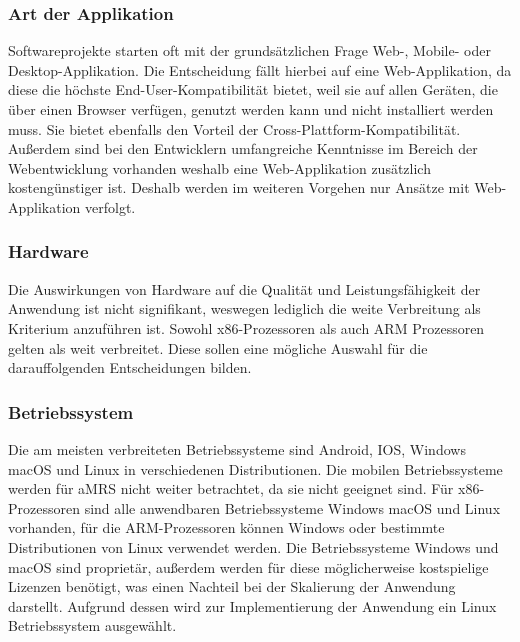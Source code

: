 \subsubsection*{Art der Applikation}
Softwareprojekte starten oft mit der grundsätzlichen Frage Web-, Mobile- oder Desktop-Applikation. Die Entscheidung fällt hierbei auf eine Web-Applikation, da diese die höchste End-User-Kompatibilität bietet, weil sie auf allen Geräten, die über einen Browser verfügen, genutzt werden kann und nicht installiert werden muss.
Sie bietet ebenfalls den Vorteil der Cross-Plattform-Kompatibilität.
Außerdem sind bei den Entwicklern umfangreiche Kenntnisse im Bereich der Webentwicklung vorhanden weshalb eine Web-Applikation zusätzlich kostengünstiger ist. 
Deshalb werden im weiteren Vorgehen nur Ansätze mit Web-Applikation verfolgt.
\subsubsection*{Hardware}
Die Auswirkungen von Hardware auf die Qualität und Leistungsfähigkeit der Anwendung ist nicht signifikant, weswegen lediglich die weite Verbreitung als Kriterium anzuführen ist.
Sowohl x86-Prozessoren als auch ARM Prozessoren gelten als weit verbreitet.
Diese sollen eine mögliche Auswahl für die darauffolgenden Entscheidungen bilden.
\subsubsection*{Betriebssystem}
Die am meisten verbreiteten Betriebssysteme sind Android, IOS, Windows macOS und Linux in verschiedenen Distributionen.
Die mobilen Betriebssysteme werden für \ac{aMRS} nicht weiter betrachtet, da sie nicht geeignet sind.
Für x86-Prozessoren sind alle anwendbaren Betriebssysteme Windows macOS und Linux vorhanden, für die ARM-Prozessoren können Windows oder bestimmte Distributionen von Linux verwendet werden.
Die Betriebssysteme Windows und macOS sind proprietär, außerdem werden für diese möglicherweise kostspielige Lizenzen benötigt, was einen Nachteil bei der Skalierung der Anwendung darstellt.
Aufgrund dessen wird zur Implementierung der Anwendung ein Linux Betriebssystem ausgewählt.

